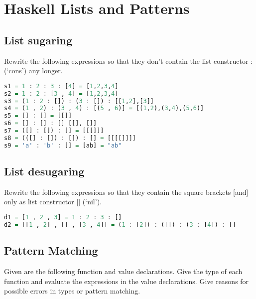 \hypertarget{haskell-lists-and-patterns}{%
\section{Haskell Lists and Patterns}\label{haskell-lists-and-patterns}}

\hypertarget{list-sugaring}{%
\subsection{List sugaring}\label{list-sugaring}}

Rewrite the following expressions so that they don't contain the list
constructor : (`cons') any longer.

\begin{lstlisting}[language=Haskell]
s1 = 1 : 2 : 3 : [4] = [1,2,3,4]
s2 = 1 : 2 : [3 , 4] = [1,2,3,4]
s3 = (1 : 2 : []) : (3 : []) : [[1,2],[3]]
s4 = (1 , 2) : (3 , 4) : [(5 , 6)] = [(1,2),(3,4),(5,6)]
s5 = [] : [] = [[]]
s6 = [] : [] : [] [[], []]
s7 = ([] : []) : [] = [[[]]]
s8 = (([] : []) : []) : [] = [[[[]]]]
s9 = 'a' : 'b' : [] = [ab] = "ab"
\end{lstlisting}

\hypertarget{list-desugaring}{%
\subsection{List desugaring}\label{list-desugaring}}

Rewrite the following expressions so that they contain the square
brackets {[}and{]} only as list constructor {[}{]} (`nil').

\begin{lstlisting}[language=Haskell]
d1 = [1 , 2 , 3] = 1 : 2 : 3 : []
d2 = [[1 , 2] , [] , [3 , 4]] = (1 : [2]) : ([]) : (3 : [4]) : []
\end{lstlisting}

\clearpage
\hypertarget{pattern-matching}{%
\subsection{Pattern Matching}\label{pattern-matching}}

Given are the following function and value declarations. Give the type
of each function and evaluate the expressions in the value declarations.
Give reasons for possible errors in types or pattern matching.


